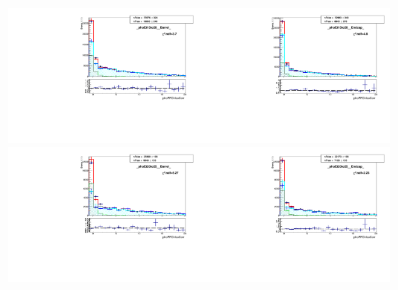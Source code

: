 \begin{figure}[htb]
  \begin{center}
   \includegraphics[width=0.45\textwidth]{../figs/figs_v11/MUON_WGamma/TemplateFits/c_TEMPL_CHISO_UNblind__phoEt15to20__Barrel__RooFit_MCclosure.pdf}\includegraphics[width=0.45\textwidth]{../figs/figs_v11/MUON_WGamma/TemplateFits/c_TEMPL_CHISO_UNblind__phoEt15to20__Endcap__RooFit_MCclosure.pdf}\\
   \includegraphics[width=0.45\textwidth]{../figs/figs_v11/MUON_WGamma/TemplateFits/c_TEMPL_CHISO_UNblind__phoEt20to25__Barrel__RooFit_MCclosure.pdf}\includegraphics[width=0.45\textwidth]{../figs/figs_v11/MUON_WGamma/TemplateFits/c_TEMPL_CHISO_UNblind__phoEt20to25__Endcap__RooFit_MCclosure.pdf}\\

\end{center}
\end{figure}
